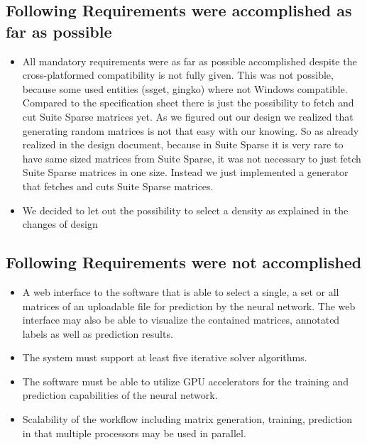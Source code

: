 \documentclass[parskip=full]{scrartcl}
\begin{document}
\subsection{Following Requirements were accomplished as far as possible}
\begin{itemize}

\item All mandatory requirements were as far as possible accomplished despite the cross-platformed compatibility is not fully given. 
This was not possible, because some used entities (ssget, gingko) where not Windows compatible.
Compared to the specification sheet there is just the possibility to fetch and cut Suite Sparse matrices yet.
As we figured out our design we realized that generating random matrices is not that easy with our knowing.
So as already realized in the design document, because in Suite Sparse it is very rare to have same sized matrices from Suite Sparse, it was not necessary to just fetch Suite Sparse matrices in one size. 
Instead we just implemented a generator that fetches and cuts Suite Sparse matrices.

\item We decided to let out the possibility to select a density as explained in the changes of design

\end{itemize}


\subsection{Following Requirements were not accomplished}
\begin{itemize}
\item A web interface to the software that is able to select a single, a set or all matrices of an uploadable file for prediction by the neural network. The web interface may also be able to visualize the contained matrices, annotated labels as well as prediction results.

\item The system must support at least five iterative solver algorithms. 

\item The software must be able to utilize GPU accelerators for the training and prediction capabilities of the neural network.

\item Scalability of the workflow including matrix generation, training, prediction in that multiple processors may be used in parallel.

\end{itemize}
\end{document}
